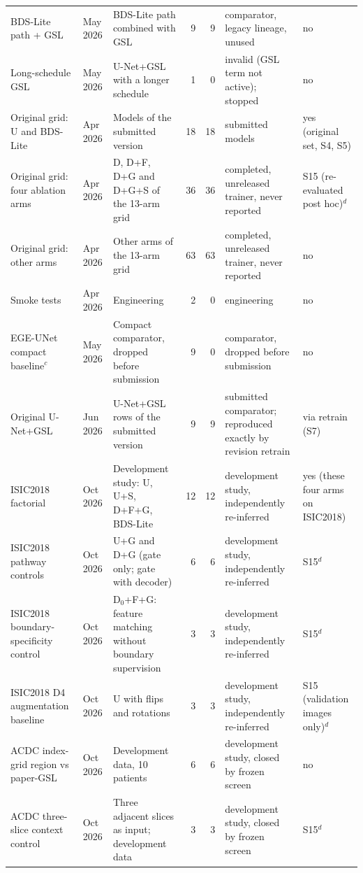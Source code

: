 \begin{longtable}{@{}p{3.0cm}p{1.5cm}p{3.6cm}rrp{2.8cm}p{2.3cm}@{}}
BDS-Lite path + GSL & May 2026 & BDS-Lite path combined with GSL & 9 & 9 & comparator, legacy lineage, unused & no \\
Long-schedule GSL & May 2026 & U-Net+GSL with a longer schedule & 1 & 0 & invalid (GSL term not active); stopped & no \\
Original grid: U and BDS-Lite & Apr 2026 & Models of the submitted version & 18 & 18 & submitted models & yes (original set, S4, S5) \\
Original grid: four ablation arms & Apr 2026 & D, D+F, D+G and D+G+S of the 13-arm grid & 36 & 36 & completed, unreleased trainer, never reported & S15 (re-evaluated post hoc)$^{d}$ \\
Original grid: other arms & Apr 2026 & Other arms of the 13-arm grid & 63 & 63 & completed, unreleased trainer, never reported & no \\
Smoke tests & Apr 2026 & Engineering & 2 & 0 & engineering & no \\
EGE-UNet compact baseline$^{c}$ & May 2026 & Compact comparator, dropped before submission & 9 & 0 & comparator, dropped before submission & no \\
Original U-Net+GSL & Jun 2026 & U-Net+GSL rows of the submitted version & 9 & 9 & submitted comparator; reproduced exactly by revision retrain & via retrain (S7) \\
ISIC2018 factorial & Oct 2026 & Development study: U, U+S, D+F+G, BDS-Lite & 12 & 12 & development study, independently re-inferred & yes (these four arms on ISIC2018) \\
ISIC2018 pathway controls & Oct 2026 & U+G and D+G (gate only; gate with decoder) & 6 & 6 & development study, independently re-inferred & S15$^{d}$ \\
ISIC2018 boundary-specificity control & Oct 2026 & D$_0$+F+G: feature matching without boundary supervision & 3 & 3 & development study, independently re-inferred & S15$^{d}$ \\
ISIC2018 D4 augmentation baseline & Oct 2026 & U with flips and rotations & 3 & 3 & development study, independently re-inferred & S15 (validation images only)$^{d}$ \\
ACDC index-grid region vs paper-GSL & Oct 2026 & Development data, 10 patients & 6 & 6 & development study, closed by frozen screen & no \\
ACDC three-slice context control & Oct 2026 & Three adjacent slices as input; development data & 3 & 3 & development study, closed by frozen screen & S15$^{d}$ \\

\end{longtable}
